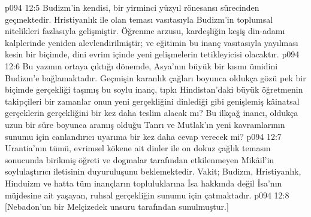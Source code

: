 \vs p094 12:5 Budizm’in kendisi, bir yirminci yüzyıl rönesansı sürecinden geçmektedir. Hristiyanlık ile olan teması vasıtasıyla Budizm’in toplumsal nitelikleri fazlasıyla gelişmiştir. Öğrenme arzusu, kardeşliğin keşiş din\hyp{}adamı kalplerinde yeniden alevlendirilmiştir; ve eğitimin bu inanç vasıtasıyla yayılması kesin bir biçimde, dini evrim içinde yeni gelişmelerin tetikleyicisi olacaktır.
\vs p094 12:6 Bu yazının ortaya çıktığı dönemde, Asya’nın büyük bir kısmı ümidini Budizm’e bağlamaktadır. Geçmişin karanlık çağları boyunca oldukça gözü pek bir biçimde gerçekliği taşımış bu soylu inanç, tıpkı Hindistan’daki büyük öğretmenin takipçileri bir zamanlar onun yeni gerçekliğini dinlediği gibi genişlemiş kâinatsal gerçeklerin gerçekliğini bir kez daha teslim alacak mı? Bu ilkçağ inancı, oldukça uzun bir süre boyunca aramış olduğu Tanrı ve Mutlak’ın yeni kavramlarının sunumu için canlandırıcı uyarıma bir kez daha cevap verecek mi?
\vs p094 12:7 Urantia’nın tümü, evrimsel kökene ait dinler ile on dokuz çağlık temasın sonucunda birikmiş öğreti ve dogmalar tarafından etkilenmeyen Mikâil’in soylulaştırıcı iletisinin duyuruluşunu beklemektedir. Vakit; Budizm, Hristiyanlık, Hinduizm ve hatta tüm inançların topluluklarına İsa hakkında değil İsa’nın müjdesine ait yaşayan, ruhsal gerçekliğin sunumu için çatmaktadır.
\vs p094 12:8 [Nebadon’un bir Melçizedek unsuru tarafından sunulmuştur.]
